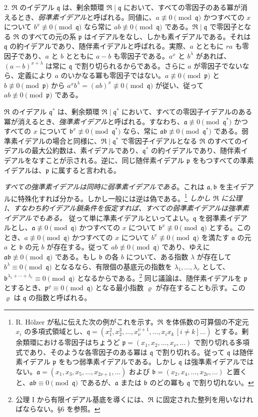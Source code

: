 \documentclass[11pt]{article}
\providecommand{\mR}{\mathfrak{R}}
\providecommand{\ma}{\mathfrak{a}}
\providecommand{\mb}{\mathfrak{b}}
\providecommand{\mpideal}{\mathfrak{p}}
\providecommand{\mq}{\mathfrak{q}}
\begin{document}
2. $\mR$ のイデアル $\mq$ は、剰余類環 $\mR\mid\mq$ において、すべての零因子のある冪が消えるとき、\emph{弱準素イデアル}と呼ばれる。同値に、$a\not\equiv0\pmod{\mq}$ かつすべての $x$ について $b^x\not\equiv0\pmod{\mq}$ なら常に $ab\not\equiv0\pmod{\mq}$ である。$\mR\mid\mq$ で零因子となる $\mR$ のすべての元の系 $\mpideal$ はイデアルをなし、しかも素イデアルである。それは $\mq$ の約イデアルであり、随伴素イデアルと呼ばれる。実際、$a$ とともに $ra$ も零因子であり、$a$ と $b$ とともに $a-b$ も零因子である。$a^x$ と $b^\lambda$ があれば、$(a-b)^{x+\lambda}$ は常に $\mq$ で割り切られるからである。さらに $a$ が零因子でないなら、定義により $a$ のいかなる冪も零因子ではない。$a\not\equiv0\pmod{\mpideal}$ と $b\not\equiv0\pmod{\mpideal}$ から $a^x b^\lambda=(ab)^x\not\equiv0\pmod{\mq}$ が従い、従って $ab\not\equiv0\pmod{\mpideal}$ である。

$\mR$ のイデアル $\mq^*$ は、剰余類環 $\mR\mid\mq^*$ において、すべての零因子イデアルのある冪が消えるとき、\emph{強準素イデアル}と呼ばれる。すなわち、$\ma\not\equiv0\pmod{\mq^*}$ かつすべての $x$ について $\mb^x\not\equiv0\pmod{\mq^*}$ なら、常に $\ma\mb\not\equiv0\pmod{\mq^*}$ である。弱準素イデアルの場合と同様に、$\mR\mid\mq^*$ で零因子イデアルとなる $\mR$ のすべてのイデアルの最大公約数は、素イデアルであり、$\mq^*$ の約イデアルであり、随伴素イデアルをなすことが示される。逆に、同じ随伴素イデアル $\mpideal$ をもつすべての準素イデアルは、$\mpideal$ に属すると言われる。

\emph{すべての強準素イデアルは同時に弱準素イデアルである}。これは $\ma,\mb$ を主イデアルに特殊化すれば分かる。しかし一般には逆は偽である。\footnote{R. Hölzer が私に伝えた次の例がこれを示す。$\mR$ を体係数の可算個の不定元 $x_i$ の多項式領域とし、$\mq=(x_1^2,x_2^3,\ldots,x_\nu^{\nu+1},\ldots,x_i x_k\,[i\ne k]\ldots)$ とする。剰余類環における零因子はちょうど $\mpideal=(x_1,x_2,\ldots,x_\nu,\ldots)$ で割り切れる多項式であり、そのような各零因子のある冪は $\mq$ で割り切れる。従って $\mq$ は随伴素イデアル $\mpideal$ をもつ弱準素イデアルである。しかし $\mq$ は強準素イデアルではない。$\ma=(x_1,x_3,x_5,\ldots,x_{2\nu+1},\ldots)$ および $\mb=(x_2,x_4,\ldots,x_{2\nu},\ldots)$ と置くと、$\ma\mb\equiv0\pmod{\mq}$ であるが、$\ma$ または $\mb$ のどの冪も $\mq$ で割り切れない。} \emph{しかし $\mR$ に公理 I、すなわち約イデアル鎖条件を仮定すれば、すべての弱準素イデアルは強準素イデアルでもある。} 従って単に準素イデアルといってよい。$\mq$ を弱準素イデアルとし、$\ma\not\equiv0\pmod{\mq}$ かつすべての $x$ について $\mb^x\not\equiv0\pmod{\mq}$ とする。このとき、$a\not\equiv0\pmod{\mq}$ かつすべての $x$ について $b^x\not\equiv0\pmod{\mq}$ を満たす $\ma$ の元 $a$ と $\mb$ の元 $b$ が存在する。従って $ab\not\equiv0\pmod{\mq}$ であり、ゆえに $\ma\mb\not\equiv0\pmod{\mq}$ である。もし $\mb$ の各 $b$ について、ある指数 $\lambda$ が存在して $b^\lambda\equiv0\pmod{\mq}$ となるなら、有限個の基底元の指数を $\lambda_1,\ldots,\lambda_r$ として、$\mb^{\lambda_1+\cdots+\lambda_r}\equiv0\pmod{\mq}$ となるからである。\footnote{公理 I から有限イデアル基底を導くには、$\mR$ に固定された整列を用いなければならない。§6 を参照。} 同じ議論は、随伴素イデアルを $\mpideal$ とするとき、$\mpideal^\varrho\equiv0\pmod{\mq}$ となる最小指数 $\varrho$ が存在することも示す。この $\varrho$ は $\mq$ の指数と呼ばれる。
\end{document}
